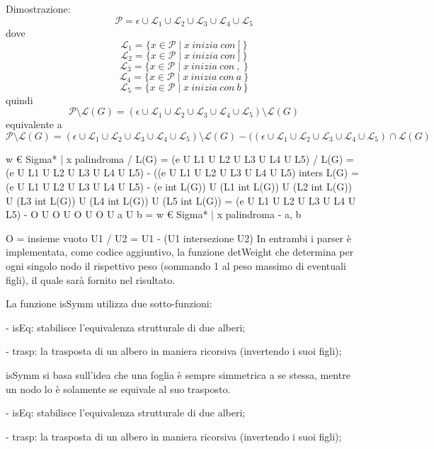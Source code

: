 \documentclass[a4paper, oneside, 11pt]{article}
\begin{document}
Dimostrazione:
\\
\[\mathcal{P}= \epsilon \cup \mathcal{L}_{1} \cup \mathcal{L}_{2} \cup \mathcal{L}_{3} \cup \mathcal{L}_{4} \cup \mathcal{L}_{5}\]
dove
\[\mathcal{L}_{1} = \{ x \in \mathcal{P} \mid x\ inizia\ con\ {[}\ \} \]
\[\mathcal{L}_{2} = \{ x \in \mathcal{P} \mid x\ inizia\ con\ {]}\ \} \]
\[\mathcal{L}_{3} = \{ x \in \mathcal{P} \mid x\ inizia\ con\ {,}\ \} \]
\[\mathcal{L}_{4} = \{ x \in \mathcal{P} \mid x\ inizia\ con\ {a}\ \} \]
\[\mathcal{L}_{5} = \{ x \in \mathcal{P} \mid x\ inizia\ con\ {b}\ \} \]
quindi
\[\mathcal{P}\setminus\mathcal{L}(G) = (\epsilon \cup \mathcal{L}_{1} \cup \mathcal{L}_{2} \cup \mathcal{L}_{3} \cup \mathcal{L}_{4} \cup \mathcal{L}_{5} )\setminus \mathcal{L}(G) \]
equivalente a
\[\mathcal{P}\setminus\mathcal{L}(G) = (\epsilon \cup \mathcal{L}_{1} \cup \mathcal{L}_{2} \cup \mathcal{L}_{3} \cup \mathcal{L}_{4} \cup \mathcal{L}_{5} )\setminus \mathcal{L}(G) - %
( (\epsilon \cup \mathcal{L}_{1} \cup \mathcal{L}_{2} \cup \mathcal{L}_{3} \cup \mathcal{L}_{4} \cup \mathcal{L}_{5} )\cap \mathcal{L}(G) \]


\newpage
{ w € Sigma* | x palindroma } / L(G) = (e U L1 U L2 U L3 U L4 U L5) / L(G)
					 = (e U L1 U L2 U L3 U L4 U L5) - ((e U L1 U L2 U L3 U L4 U L5) inters L(G)
					 = (e U L1 U L2 U L3 U L4 U L5) - (e int L(G)) U (L1 int L(G)) U (L2 int L(G)) U (L3 int L(G)) U (L4 int L(G)) U (L5 int L(G))
					 = (e U L1 U L2 U L3 U L4 U L5) - O U O U O U O U {a} U {b}
					 = { w € Sigma* | x palindroma } - {a, b}
									 
O = insieme vuoto
U1 / U2 = U1 - (U1 intersezione U2)
\newpage
In entrambi i parser \`e implementata, come codice aggiuntivo, la funzione detWeight che determina per ogni singolo nodo il rispettivo peso (sommando 1 al peso massimo di eventuali figli), il quale sarà fornito nel risultato.

   La funzione isSymm utilizza due sotto-funzioni:

- isEq: stabilisce l'equivalenza strutturale di due alberi;

- trasp: la trasposta di un albero in maniera ricorsiva (invertendo i suoi figli);

isSymm si basa sull'idea che una foglia \`e sempre simmetrica a se stessa, mentre un nodo lo \`e solamente se equivale al suo trasposto.


- isEq: stabilisce l'equivalenza strutturale di due alberi;

- trasp: la trasposta di un albero in maniera ricorsiva (invertendo i suoi figli);
\end{document}
